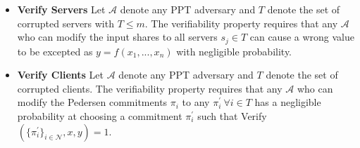 \begin{itemize}
\begin{itemize}
 						\item \textbf{Verify Servers }Let $\mathcal{A}$ denote any PPT  adversary and $T$ denote the set of corrupted servers with $T\leq m$. The verifiability 							property requires that any $\mathcal{A}$ who can modify the input shares to all servers $s_j\in T$ can cause a wrong value to be excepted as 							$y=f(x_1,...,x_n)$ with negligible probability.   
 						\item \textbf{Verify Clients} Let $\mathcal{A}$ denote any PPT adversary and $T$ denote the set of corrupted clients. The verifiability property requires that any $\mathcal{A}$ who can modify the Pedersen commitments $\pi_i$  to any $\pi_i^{'} \:\forall  i\in T$ has a negligible probability at choosing a commitment $\pi_i^{'}$ such that Verify$( \{\pi^{'}_i\}_{i\in\mathcal{N}},x,y)=1$.
 			\end{itemize} 
\end{itemize}


